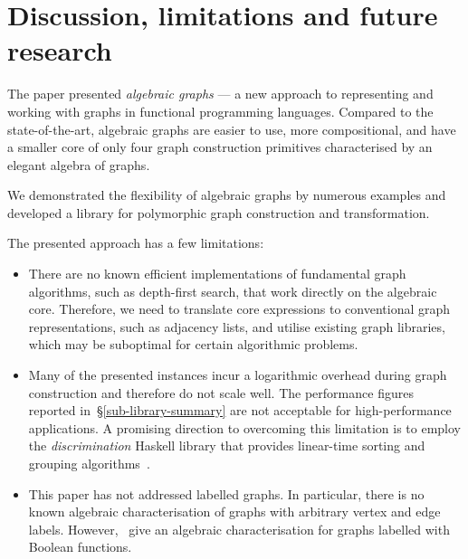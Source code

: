 \section{Discussion, limitations and future research}\label{sec-discussion}

The paper presented \emph{algebraic graphs} --- a new approach to representing and
working with graphs in functional programming languages.
Compared to the state-of-the-art, algebraic graphs are easier to use,
more compositional, and have a smaller core of only four graph
construction primitives characterised by an elegant algebra of graphs.

We demonstrated the flexibility of algebraic graphs by numerous examples and
developed a library for polymorphic graph construction and transformation.

The presented approach has a few limitations:

\begin{itemize}
    \item There are no known efficient implementations of fundamental graph
    algorithms, such as depth-first search, that work directly on the algebraic
    core. Therefore, we need to translate core expressions to conventional
    graph representations, such as adjacency lists, and utilise existing graph
    libraries, which may be suboptimal for certain algorithmic problems.

    \item Many of the presented  instances incur a logarithmic overhead
    during graph construction and therefore do not scale well. The performance
    figures reported in~\S\ref{sub-library-summary} are not acceptable for
    high-performance applications. A promising direction to overcoming this limitation
    is to employ the \emph{discrimination} Haskell library that provides linear-time
    sorting and grouping algorithms~\cite{2012_henglein_discriminations}.

    \item This paper has not addressed labelled graphs. In particular, there is
    no known algebraic characterisation of
    graphs with arbitrary vertex and edge labels. However,~\citet{2014_algebra_mokhov}
    give an algebraic characterisation for graphs labelled with Boolean functions.
\end{itemize}

